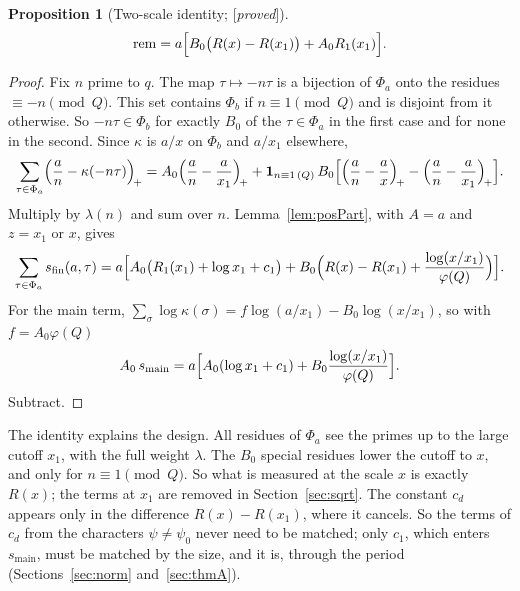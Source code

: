 \documentclass[11pt]{amsart}
\numberwithin{equation}{section}
\newtheorem{proposition}[theorem]{Proposition}
\theoremstyle{definition}
\theoremstyle{remark}
\newcommand{\status}[1]{\textup{[\emph{#1}]}}
\begin{document}
\begin{proposition}[Two-scale identity; \status{proved}]\label{prop:twoscale}
\begin{equation}\label{eq:twoscale}
 \mathrm{rem}=a\Bigl[B_0\bigl(R(x)-R(x_1)\bigr)+A_0R_1(x_1)\Bigr].
\end{equation}
\end{proposition}
\begin{proof}
Fix $n$ prime to $q$. The map $\tau\mapsto-n\tau$ is a bijection of $\Phi_a$ onto the residues $\equiv-n\pmod Q$. This set contains $\Phi_b$ if $n\equiv1\pmod Q$ and is disjoint from it otherwise. So $-n\tau\in\Phi_b$ for exactly $B_0$ of the $\tau\in\Phi_a$ in the first case and for none in the second. Since $\kappa$ is $a/x$ on $\Phi_b$ and $a/x_1$ elsewhere,
\begin{equation}
 \sum_{\tau\in\Phi_a}\Bigl(\frac an-\kappa(-n\tau)\Bigr)_{\!+}
 =A_0\Bigl(\frac an-\frac a{x_1}\Bigr)_{\!+}
 +\mathbf 1_{n\equiv1\,(Q)}\,B_0\Bigl[\Bigl(\frac an-\frac ax\Bigr)_{\!+}-\Bigl(\frac an-\frac a{x_1}\Bigr)_{\!+}\Bigr].
\end{equation}
Multiply by $\lambda(n)$ and sum over $n$. Lemma~\ref{lem:posPart}, with $A=a$ and $z=x_1$ or $x$, gives
\begin{equation}
 \sum_{\tau\in\Phi_a}s_{\mathrm{fin}}(a,\tau)=a\Bigl[A_0\bigl(R_1(x_1)+\log x_1+c_1\bigr)
 +B_0\Bigl(R(x)-R(x_1)+\frac{\log(x/x_1)}{\varphi(Q)}\Bigr)\Bigr].
\end{equation}
For the main term, $\sum_\sigma\log\kappa(\sigma)=f\log(a/x_1)-B_0\log(x/x_1)$, so with $f=A_0\varphi(Q)$
\begin{equation}
 A_0\,s_{\mathrm{main}}=a\Bigl[A_0(\log x_1+c_1)+B_0\frac{\log(x/x_1)}{\varphi(Q)}\Bigr].
\end{equation}
Subtract.
\end{proof}

The identity explains the design. All residues of $\Phi_a$ see the primes up to the large cutoff $x_1$, with the full weight $\lambda$. The $B_0$ special residues lower the cutoff to $x$, and only for $n\equiv1\pmod Q$. So what is measured at the scale $x$ is exactly $R(x)$; the terms at $x_1$ are removed in Section~\ref{sec:sqrt}. The constant $c_d$ appears only in the difference $R(x)-R(x_1)$, where it cancels. So the terms of $c_d$ from the characters $\psi\ne\psi_0$ never need to be matched; only $c_1$, which enters $s_{\mathrm{main}}$, must be matched by the size, and it is, through the period (Sections~\ref{sec:norm} and~\ref{sec:thmA}).
\end{document}
